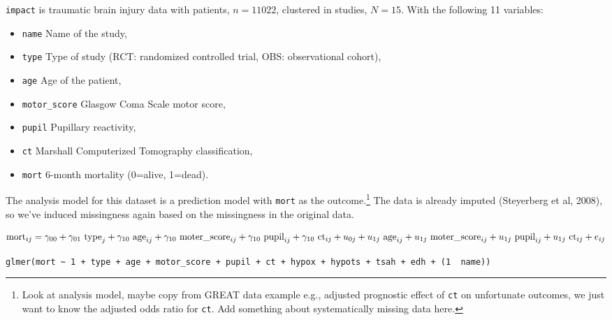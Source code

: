 \documentclass[
]{jss}
\providecommand{\tightlist}{%
  \setlength{\itemsep}{0pt}\setlength{\parskip}{0pt}}
\begin{document}
\texttt{impact} is traumatic brain injury data with patients,
\(n = 11022\), clustered in studies, \(N = 15\). With the following 11
variables:

\begin{itemize}
\tightlist
\item
  \texttt{name} Name of the study,
\item
  \texttt{type} Type of study (RCT: randomized controlled trial, OBS:
  observational cohort),
\item
  \texttt{age} Age of the patient,
\item
  \texttt{motor\_score} Glasgow Coma Scale motor score,
\item
  \texttt{pupil} Pupillary reactivity,
\item
  \texttt{ct} Marshall Computerized Tomography classification,
\item
  \texttt{mort} 6-month mortality (0=alive, 1=dead).
\end{itemize}

The analysis model for this dataset is a prediction model with
\texttt{mort} as the outcome.\footnote{Look at analysis model, maybe
  copy from GREAT data example e.g., adjusted prognostic effect of
  \texttt{ct} on unfortunate outcomes, we just want to know the adjusted
  odds ratio for \texttt{ct}. Add something about systematically missing
  data here.} The data is already imputed (Steyerberg et al, 2008), so
we've induced missingness again based on the missingness in the original
data.

\[
\text{mort}_{ij} =
\gamma_{00} + 
\gamma_{01} \text{ type}_{j} + 
\gamma_{10} \text{ age}_{ij} + 
\gamma_{10} \text{ moter\_score}_{ij} + 
\gamma_{10} \text{ pupil}_{ij} + 
\gamma_{10} \text{ ct}_{ij} + \\
u_{0j} + 
u_{1j} \text{ age}_{ij} + 
u_{1j} \text{ moter\_score}_{ij} +  
u_{1j} \text{ pupil}_{ij} +  
u_{1j} \text{ ct}_{ij} +  
e_{ij} \\
\]

\texttt{glmer(mort\ \textasciitilde{}\ 1\ +\ type\ +\ age\ +\ motor\_score\ +\ pupil\ +\ ct\ +\ hypox\ +\ hypots\ +\ tsah\ +\ edh\ +\ (1\ \textbar{}\ name))}
\end{document}
